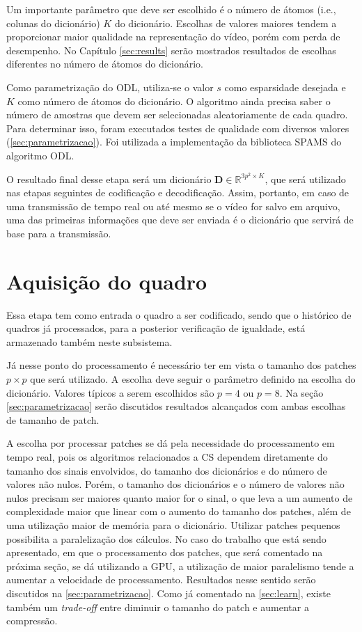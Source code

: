 \documentclass[cic,tc]{iiufrgs}
\newcommand{\mat}[1]{\bm{#1}}
\begin{document}
Um importante parâmetro que deve ser escolhido é o número de átomos (i.e., colunas do dicionário) $K$ do dicionário.
Escolhas de valores maiores tendem a proporcionar maior qualidade na representação do vídeo,
porém com perda de desempenho. No Capítulo \ref{sec:results} serão mostrados resultados
de escolhas diferentes no número de átomos do dicionário.

Como parametrização do ODL, utiliza-se o valor $s$ como esparsidade desejada e
$K$ como número de átomos do dicionário.
O algoritmo ainda precisa saber o número de amostras que devem ser selecionadas aleatoriamente
de cada quadro.
Para determinar isso, foram executados testes de qualidade com diversos valores
(\autoref{sec:parametrizacao}).
Foi utilizada a implementação da biblioteca SPAMS \cite{SPAMS} do algoritmo ODL.

O resultado final desse etapa será um dicionário $\mat{D} \in \mathbb{R}^{3p^2 \times K}$,
que será utilizado nas etapas seguintes de codificação e decodificação.
Assim, portanto, em caso de uma transmissão de tempo real ou até mesmo se o vídeo for salvo em arquivo,
uma das primeiras informações que deve ser enviada é o dicionário que servirá de base
para a transmissão.


\section{Aquisição do quadro}
\label{sec:quadroaquisition}
Essa etapa tem como entrada o quadro a ser codificado, sendo que o histórico de quadros já
processados, para a posterior verificação de igualdade, está armazenado também neste
subsistema.

Já nesse ponto do processamento é necessário ter em vista o tamanho dos patches $p\times p$
que será utilizado. A escolha deve seguir o parâmetro definido na escolha do dicionário.
Valores típicos a serem escolhidos são $p=4$ ou $p=8$. Na seção \ref{sec:parametrizacao} serão 
discutidos resultados alcançados com ambas escolhas de tamanho de patch.

A escolha por processar patches se dá pela necessidade do processamento em tempo real, pois 
os algoritmos relacionados a CS dependem diretamente do tamanho
dos sinais envolvidos, do tamanho dos dicionários e do número de valores não nulos.
Porém, o tamanho dos dicionários e o número de valores não nulos precisam ser maiores quanto maior for 
o sinal, o que leva a um aumento de complexidade maior que linear com o aumento do tamanho dos
patches, além de uma utilização maior de memória para o dicionário.
Utilizar patches pequenos possibilita a paralelização dos cálculos.
No caso do trabalho que está sendo apresentado, em que o processamento dos patches, que será 
comentado na próxima seção, se dá utilizando a GPU, a utilização de maior 
paralelismo tende a aumentar a velocidade de processamento.
Resultados nesse sentido serão discutidos na \autoref{sec:parametrizacao}.
Como já comentado na \autoref{sec:learn}, existe também um \textit{trade-off} entre 
diminuir o tamanho do patch e aumentar a compressão.
\end{document}
